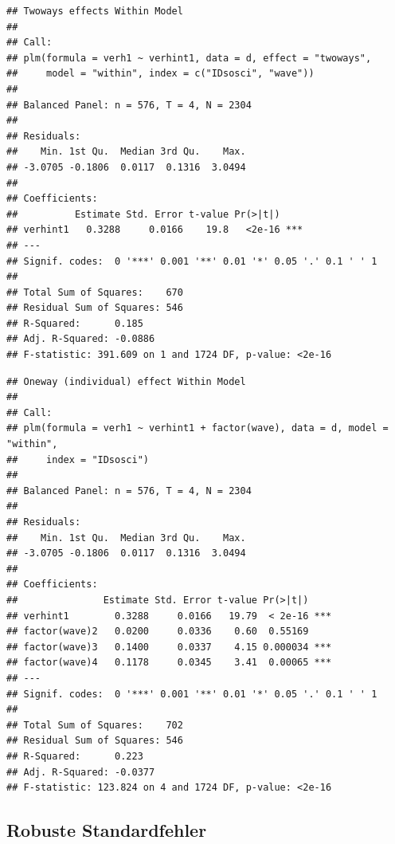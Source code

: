 \documentclass[
]{book}
\newenvironment{Shaded}{\begin{snugshade}}{\end{snugshade}}
\newcommand{\DataTypeTok}[1]{\textcolor[rgb]{0.13,0.29,0.53}{#1}}
\newcommand{\KeywordTok}[1]{\textcolor[rgb]{0.13,0.29,0.53}{\textbf{#1}}}
\newcommand{\NormalTok}[1]{#1}
\newcommand{\OperatorTok}[1]{\textcolor[rgb]{0.81,0.36,0.00}{\textbf{#1}}}
\newcommand{\StringTok}[1]{\textcolor[rgb]{0.31,0.60,0.02}{#1}}
\begin{document}
\begin{verbatim}
## Twoways effects Within Model
## 
## Call:
## plm(formula = verh1 ~ verhint1, data = d, effect = "twoways", 
##     model = "within", index = c("IDsosci", "wave"))
## 
## Balanced Panel: n = 576, T = 4, N = 2304
## 
## Residuals:
##    Min. 1st Qu.  Median 3rd Qu.    Max. 
## -3.0705 -0.1806  0.0117  0.1316  3.0494 
## 
## Coefficients:
##          Estimate Std. Error t-value Pr(>|t|)    
## verhint1   0.3288     0.0166    19.8   <2e-16 ***
## ---
## Signif. codes:  0 '***' 0.001 '**' 0.01 '*' 0.05 '.' 0.1 ' ' 1
## 
## Total Sum of Squares:    670
## Residual Sum of Squares: 546
## R-Squared:      0.185
## Adj. R-Squared: -0.0886
## F-statistic: 391.609 on 1 and 1724 DF, p-value: <2e-16
\end{verbatim}

\begin{Shaded}
\end{Shaded}

\begin{verbatim}
## Oneway (individual) effect Within Model
## 
## Call:
## plm(formula = verh1 ~ verhint1 + factor(wave), data = d, model = "within", 
##     index = "IDsosci")
## 
## Balanced Panel: n = 576, T = 4, N = 2304
## 
## Residuals:
##    Min. 1st Qu.  Median 3rd Qu.    Max. 
## -3.0705 -0.1806  0.0117  0.1316  3.0494 
## 
## Coefficients:
##               Estimate Std. Error t-value Pr(>|t|)    
## verhint1        0.3288     0.0166   19.79  < 2e-16 ***
## factor(wave)2   0.0200     0.0336    0.60  0.55169    
## factor(wave)3   0.1400     0.0337    4.15 0.000034 ***
## factor(wave)4   0.1178     0.0345    3.41  0.00065 ***
## ---
## Signif. codes:  0 '***' 0.001 '**' 0.01 '*' 0.05 '.' 0.1 ' ' 1
## 
## Total Sum of Squares:    702
## Residual Sum of Squares: 546
## R-Squared:      0.223
## Adj. R-Squared: -0.0377
## F-statistic: 123.824 on 4 and 1724 DF, p-value: <2e-16
\end{verbatim}

\hypertarget{robuste-standardfehler}{%
\subsection*{Robuste Standardfehler}\label{robuste-standardfehler}}
\end{document}
